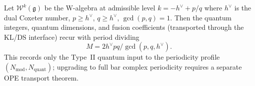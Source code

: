\begin{proposition}
\label{prop:periodicity-quantum-input}
Let $\mathcal{W}^k(\mathfrak{g})$ be the W-algebra at admissible level $k = -h^{\vee} + p/q$ where $h^{\vee}$ is the dual Coxeter number, $p \geq h^\vee$, $q \geq h^\vee$, $\gcd(p,q) = 1$. Then the quantum integers, quantum dimensions, and fusion coefficients (transported through the KL/DS interface) recur with period dividing
\[
M = 2h^{\vee}pq/\gcd(p,q,h^{\vee}).
\]
This records only the Type~II quantum input to the periodicity profile $(N_{\mathrm{mod}}, N_{\mathrm{quant}})$; upgrading to full bar complex periodicity requires a separate OPE transport theorem.
\end{proposition}

